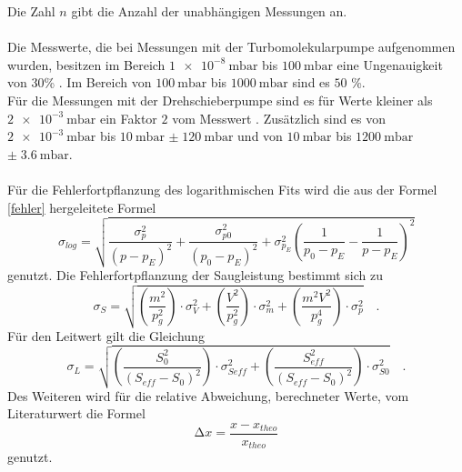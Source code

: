         \noindent
        Die Zahl $n$ gibt die Anzahl der unabhängigen Messungen an.\\\\
        Die Messwerte, die bei Messungen mit der Turbomolekularpumpe aufgenommen wurden, besitzen im Bereich $\SI{1e-8}{\milli\bar}$ bis $\SI{100}{\milli\bar}$ eine Ungenauigkeit von $30$\% \cite{V70}.
        Im Bereich von $\SI{100}{\milli\bar}$ bis $\SI{1000}{\milli\bar}$ sind es $50$ \%.\\
        Für die Messungen mit der Drehschieberpumpe sind es für Werte kleiner als $\SI{2e-3}{\milli\bar}$ ein Faktor $2$ vom Messwert \cite{V70}.
        Zusätzlich sind es von $\SI{2e-3}{\milli\bar}$ bis $\SI{10}{\milli\bar}$ $\pm\; \SI{120}{\milli\bar}$ 
        und von $\SI{10}{\milli\bar}$ bis $\SI{1200}{\milli\bar}$ $\pm \;\SI{3.6}{\milli\bar}$.\\\\
        Für die Fehlerfortpflanzung des logarithmischen Fits wird die aus der Formel \ref*{fehler} hergeleitete Formel 
        \begin{equation*}
          \sigma_{log} = \sqrt{\frac{\sigma_p^2}{(p-p_E)^2}+\frac{\sigma_{p0}^2}{(p_0-p_E)^2}+\sigma_{p_E}^2 \left(\frac{1}{p_0-p_E}-\frac{1}{p-p_E}\right)^2}
        \end{equation*}
        genutzt. Die Fehlerfortpflanzung der Saugleistung bestimmt sich zu
        \begin{equation*}
          \sigma_{S} = \sqrt{\left(\frac{m^2}{p_g^2}\right) \cdot \sigma_{V}^2 + \left(\frac{V^2}{p_g^2}\right) \cdot \sigma_m^2 + \left(\frac{m^2 V^2}{p_g^4}\right) \cdot \sigma_p^2} \quad .
        \end{equation*}
        Für den Leitwert gilt die Gleichung
        \begin{equation}
          \sigma_{L} = \sqrt{\left( \frac{ S_0^2}{(S_{eff}- S_0)^2} \right) \cdot \sigma_{Seff}^2 + \left( \frac{S_{eff}^2}{(S_{eff}- S_0)^2} \right) \cdot \sigma_{S0}^2} \quad .
          \label{eqn:errL}
        \end{equation}
        Des Weiteren wird für die relative Abweichung, berechneter Werte, vom Literaturwert die Formel 
        \begin{equation*}
          \increment x = \frac{x - x_{theo}}{x_{theo}}
        \end{equation*}
        genutzt.


